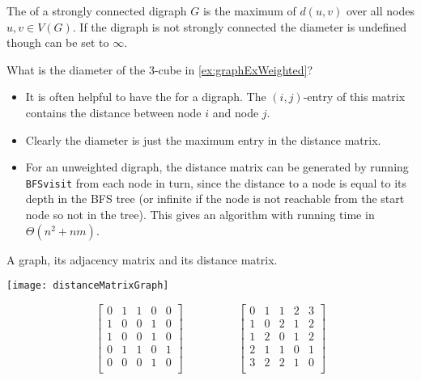 \begin{Definition} \label{def:diameter}
The  of a strongly connected digraph $G$ is the
maximum of $d(u,v)$ over all nodes $u, v \in V(G)$. 
If the digraph is not strongly connected the diameter is undefined though can be set to $\infty$.
\end{Definition}

\begin{Boxample}[1]
What is the diameter of the 3-cube in \cref{ex:graphExWeighted}?

\end{Boxample}

\begin{itemize}
  \item It is often helpful to have the  for a digraph.
  The $(i, j)$-entry of this matrix contains the distance between node $i$ and node $j$.
  \item Clearly the diameter is just the maximum entry in the distance matrix.
  \item For an unweighted digraph, the distance matrix can be generated by running \texttt{BFSvisit}
  from each node in turn, since the distance to a node is equal to its depth in the BFS tree 
  (or infinite if the node is not reachable from the start node so not in the tree). 
  This gives an algorithm with running time in $\Theta(n^2 + nm)$.
\end{itemize}

\begin{Boxample}
A graph, its adjacency matrix and its distance matrix.\\

\begin{minipage}[c]{0.3\textwidth}
\centering
\texttt{[image: distanceMatrixGraph]}
\end{minipage}
\begin{minipage}[c]{0.65\textwidth}
$$\left[
\begin{array}{ccccc}
0 & 1 & 1 & 0 & 0 \\
1 & 0 & 0 & 1 & 0 \\
1 & 0 & 0 & 1 & 0 \\
0 & 1 & 1 & 0 & 1 \\
0 & 0 & 0 & 1 & 0 \\
\end{array}
\right]
\hspace{2cm}
\left[
\begin{array}{ccccc}
0 & 1 & 1 & 2 & 3 \\
1 & 0 & 2 & 1 & 2 \\
1 & 2 & 0 & 1 & 2 \\
2 & 1 & 1 & 0 & 1 \\
3 & 2 & 2 & 1 & 0 \\
\end{array}
\right]$$
\end{minipage} 
\end{Boxample}

